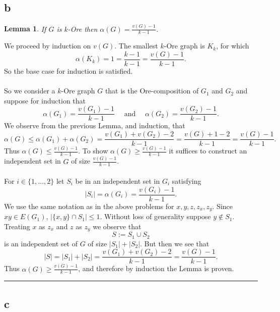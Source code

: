 \documentclass[letterpaper,12pt,oneside,onecolumn]{article}
\newenvironment{proof}{{\bf Proof:  }}{\hfill\rule{2mm}{2mm}}
\newtheorem{lemma}[fact]{Lemma}
\begin{document}
\subsection{b}
\begin{lemma}
	If $G$ is $k$-Ore then $\alpha(G) = \frac{v(G) - 1}{k-1}$.
\end{lemma}
\begin{proof}
	We proceed by induction on $v(G)$. The smallest $k$-Ore graph is $K_k$, for which
	$$\alpha(K_k) = 1 = \frac{k-1}{k-1} = \frac{v(G) -1}{k-1}.$$
	So the base case for induction is satisfied.
	\paragraph{}
	So we consider a $k$-Ore graph $G$ that is the Ore-composition of $G_1$ and $G_2$ and suppose for induction that
	$$\alpha(G_1) = \frac{v(G_1) - 1}{k-1} \quad\text{ and }\quad \alpha(G_2) = \frac{v(G_2) -1}{k-1}.$$
	We observe from the previous Lemma, and induction, that
	$$\alpha(G) \leq \alpha(G_1) + \alpha(G_2) = \frac{v(G_1) +v(G_2)- 2}{k-1} = \frac{v(G) + 1 - 2}{k-1} = \frac{v(G) - 1}{k-1}.$$
	Thus $\alpha(G) \leq \frac{v(G) - 1}{k-1}$. To show $\alpha(G) \geq \frac{v(G) - 1}{k-1}$ it suffices to construct an independent set in $G$ of size $\frac{v(G) - 1}{k-1}$.
	\paragraph{}
	For $i \in \{1, \dots, 2\}$ let $S_i$ be in an independent set in $G_i$ satisfying $$|S_i| = \alpha(G_i) = \frac{v(G_i) - 1}{k-1}.$$ We use the same notation as in the above problems for $x,y, z, z_x, z_y$. Since $xy \in E(G_1)$, $|\{x,y\} \cap S_1| \leq 1$. Without loss of generality suppose $y \not\in S_1$. Treating $x$ as $z_x$ and $z$ as $z_y$ we observe that
	$$S := S_1 \cup S_2$$
	is an independent set of $G$ of size $|S_1| + |S_2|$. But then we see that
	$$|S| = |S_1| + |S_2| =  \frac{v(G_1) +v(G_2)- 2}{k-1} = \frac{v(G) - 1}{k-1}.$$
	Thus $\alpha(G) \geq \frac{v(G) - 1}{k-1}$, and therefore by induction the Lemma is proven.
\end{proof}

\subsection{c}
\end{document}
